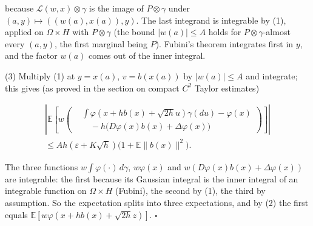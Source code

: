 \documentclass[11pt,a4paper]{article}
\begin{document}
because \(\mathcal L(w,x)\otimes\gamma\) is the image of \(P\otimes\gamma\) under \((a,y)\mapsto((w(a),x(a)),y)\). The last integrand is integrable by (1), applied on \(\Omega\times H\) with \(P\otimes\gamma\) (the bound \(|w(a)|\le A\) holds for \(P\otimes\gamma\)-almost every \((a,y)\), the first marginal being \(P\)). Fubini's theorem integrates first in \(y\), and the factor \(w(a)\) comes out of the inner integral.




(3) Multiply (1) at \(y=x(a)\), \(v=b(x(a))\) by \(|w(a)|\le A\) and integrate; this gives (as proved in the section on compact \(C^2\) Taylor estimates)


\[\begin{gathered}
\left|\mathbb E\left[w\left(\begin{aligned}
&\int\varphi(x+hb(x)+\sqrt{2h}u)\gamma(du)-\varphi(x)\\
&\quad-h\bigl(D\varphi(x)b(x)+\Delta\varphi(x)\bigr)
\end{aligned}\right)\right]\right|\\
\le Ah(\varepsilon+K\sqrt h)\bigl(1+\mathbb E\|b(x)\|^2\bigr).
\end{gathered}\]


The three functions \(w\int\varphi(\cdot)\,d\gamma\), \(w\varphi(x)\) and \(w(D\varphi(x)b(x)+\Delta\varphi(x))\) are integrable: the first because its Gaussian integral is the inner integral of an integrable function on \(\Omega\times H\) (Fubini), the second by (1), the third by assumption. So the expectation splits into three expectations, and by (2) the first equals \(\mathbb E[w\varphi(x+hb(x)+\sqrt{2h}z)]\). \(\square\)
\end{document}
